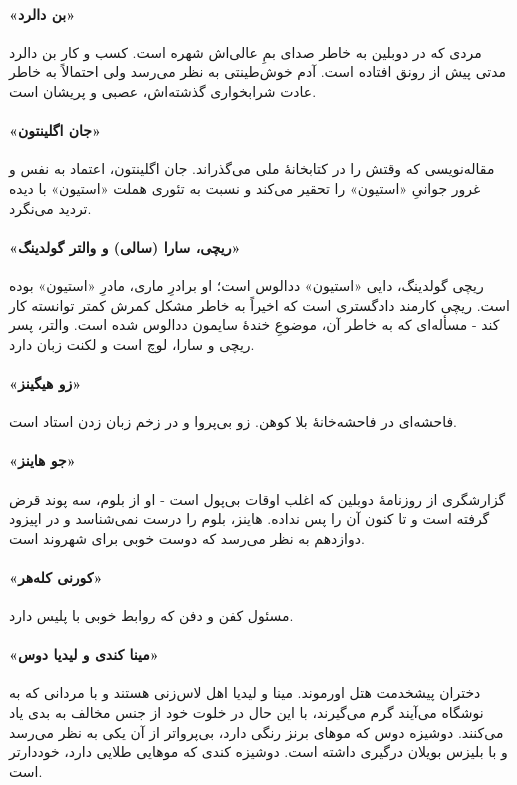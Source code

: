 \documentclass[12pt]{book}
\newcommand{\noun}[1]{«{#1}»}
\begin{document}
    \paragraph{\noun{بن دالرد}\protect{}}
    مردی که در دوبلین به خاطر صدای بمِ عالی‌اش شهره است. کسب و کار بن دالرد مدتی پیش از رونق افتاده است. آدم خوش‌طینتی به نظر می‌رسد ولی احتمالاً به خاطر عادت شرابخواری گذشته‌اش، عصبی و پریشان است.
    \paragraph{\noun{جان اگلینتون}\protect{}}
    مقاله‌نویسی که وقتش را در کتابخانۀ ملی می‌گذراند. جان اگلینتون، اعتماد به نفس و غرور جوانیِ \noun{استیون} را تحقیر می‌کند و نسبت به تئوری هملت \noun{استیون} با دیده تردید می‌نگرد.
    \paragraph{\noun{ریچی، سارا (سالی) و والتر گولدینگ}\protect{}}
    ریچی گولدینگ، دایی \noun{استیون} ددالوس است؛ او برادرِ ماری، مادرِ \noun{استیون} بوده است. ریچی کارمند دادگستری است که اخیراً به خاطر مشکل کمرش کمتر توانسته کار کند - مسأله‌ای که به خاطر آن، موضوعِ خندۀ سایمون ددالوس شده است. والتر، پسر ریچی و سارا، لوچ است و لکنت زبان دارد.
    \paragraph{\noun{زو هیگینز}\protect{}}
    فاحشه‌ای در فاحشه‌خانۀ بلا کوهن. زو بی‌پروا و در زخم زبان زدن استاد است.
    \paragraph{\noun{جو هاینز}\protect{}}
    گزارشگری از روزنامۀ دوبلین که اغلب اوقات بی‌پول است - او از بلوم، سه پوند قرض گرفته است و تا کنون آن را پس نداده. هاینز، بلوم را درست نمی‌شناسد و در اپیزود دوازدهم به نظر می‌رسد که دوست خوبی برای شهروند است.
    \paragraph{\noun{کورنی کله‌هر}\protect{}}
    مسئول کفن و دفن که روابط خوبی با پلیس دارد.
    \paragraph{\noun{مینا کندی و لیدیا دوس}\protect{}}
    دختران پیشخدمت هتل اورموند. مینا و لیدیا اهل لاس‌زنی هستند و با مردانی که به نوشگاه می‌آیند گرم می‌گیرند، با این حال در خلوت خود از جنس مخالف به بدی یاد می‌کنند. دوشیزه دوس که موهای برنز رنگی دارد، بی‌پرواتر از آن یکی به نظر می‌رسد و با بلیزس بویلان درگیری داشته است. دوشیزه کندی که موهایی طلایی دارد، خوددارتر است.
\end{document}
